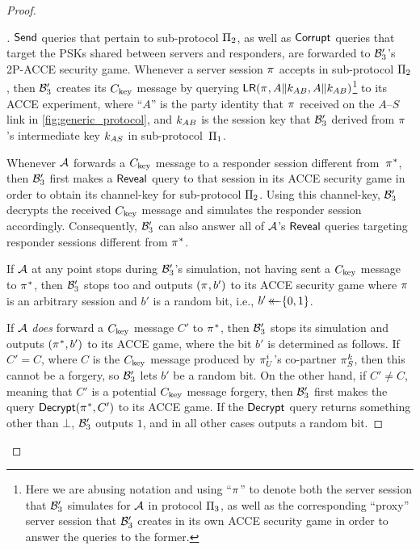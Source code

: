 \begin{proof}
\begin{proof}[]
$\Send$ queries that pertain to sub-protocol $\protocol_2$,
as well as $\Corrupt$ queries that target the PSKs shared between servers and responders,
are forwarded to $\A[B]'_3$'s 2P-ACCE security game.
Whenever a server session $\oracle$ accepts in sub-protocol $\protocol_2$, 
then $\A[B]'_3$ creates its $\Ckey$ message by querying $\Encrypt(\oracle, A \concat \key_{AB}, A \concat \key_{AB})$\footnote{Here
we are abusing notation and using ``$\oracle$'' to denote both the server session that $\A[B]'_3$ simulates for $\A$ in protocol $\protocol_3$,
as well as the corresponding ``proxy'' server session that $\A[B]'_3$ creates in its own ACCE security game in order to answer the queries to the former. 
}
 to its ACCE experiment,
where ``$A$'' is the party identity that $\oracle$ received on the $A$--$S$ link in \cref{fig:generic_protocol},  and $\key_{AB}$ is the session key that $\A[B]'_3$ derived from $\oracle$'s intermediate key $\key_{AS}$ in sub-protocol~$\protocol_1$.


Whenever $\A$ forwards a $\Ckey$ message to a responder session different from~$\oracle^*$,
then $\A[B]'_3$ first makes a $\Reveal$ query to that session in its ACCE security game in order to obtain its channel-key for sub-protocol $\protocol_2$.
Using this channel-key,
$\A[B]'_3$ decrypts the received $\Ckey$ message and simulates the responder session accordingly.
Consequently,
$\A[B]'_3$ can also answer all of $\A$'s $\Reveal$ queries targeting responder sessions different from $\oracle^*$. 

If $\A$ at any point stops during $\A[B]'_3$'s simulation,
not having sent a $\Ckey$ message to $\oracle^*$,
then $\A[B]'_3$ stops too and outputs $(\oracle, b')$ to its ACCE security game where $\oracle$ is an arbitrary session and $b'$ is a random bit,
i.e., $b' \getsr \bits$.

If $\A$ \emph{does} forward a $\Ckey$ message $C'$ to $\oracle^*$,
then $\A[B]'_3$ stops its simulation and outputs $(\oracle^*, b')$ to its ACCE game,
where the bit $b'$ is determined as follows.
If $C' = C$, 
where $C$ is the $\Ckey$ message produced by $\oracle[U][i]$'s co-partner $\oracle[S][k]$,
then this cannot be a forgery,
so $\A[B]'_3$ lets $b'$ be a random bit.
On the other hand, 
if $C' \neq C$,
meaning that $C'$ is a potential $\Ckey$ message forgery,
then $\A[B]'_3$ first makes the query $ \Decrypt(\oracle^*, C')$ to its ACCE game.
If the $\Decrypt$ query returns something other than $\bot$,
$\A[B]'_3$ outputs $1$,
and in all other cases outputs a random bit.




\end{proof}
\end{proof}
